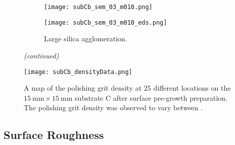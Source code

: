 \begin{figure}[htbp]
\ContinuedFloat
    \centering
    \begin{subfigure}[t]{\textwidth}
          \begin{minipage}[t]{0.49\linewidth}
            \centering
            \texttt{[image: subCb\_sem\_03\_m010.png]}
          \end{minipage}
          \hfill
          \begin{minipage}[t]{0.49\linewidth}
            \centering
            \texttt{[image: subCb\_sem\_03\_m010\_eds.png]}
          \end{minipage}
        \caption{Large silica agglomeration.}\label{fig:subCb_silica_large}
    \end{subfigure}
    \captionsetup{list=no}
    \caption{\emph{(continued)}}
\end{figure}


\begin{figure}[htbp]
    \centering
    \texttt{[image: subCb\_densityData.png]}
    \caption[Map of the polishing grit density on substrate C after surface pre-growth preparation.]{A map of the polishing grit density at 25 different locations on the $\SI{15}{\milli\metre}\times\SI{15}{\milli\metre}$ substrate C after surface pre-growth preparation. The polishing grit density was observed to vary between .}
    \label{fig:subCb_densityData}
\end{figure}


\subsection{Surface Roughness}

